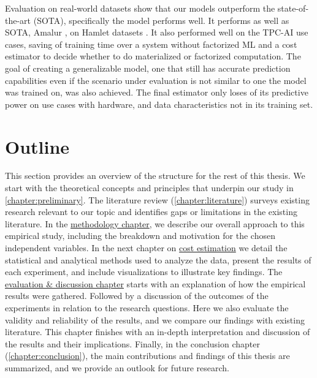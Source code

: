 Evaluation on real-world datasets show that our models outperform the state-of-the-art (SOTA), specifically the  model performs well. It performs  as well as SOTA, Amalur \cite{schijndel_cost_estimation}, on Hamlet datasets \cite{2016-hamlet-sigmod}. It also performed well on the TPC-AI use cases, saving  of training time over a system without factorized ML and a cost estimator to decide whether to do materialized or factorized computation. The goal of creating a generalizable model, one that still has accurate prediction capabilities even if the scenario under evaluation is not similar to one the model was trained on, was also achieved. The final estimator only loses  of its predictive power on use cases with hardware, and data characteristics not in its training set.


\section{Outline}
This section provides an overview of the structure for the rest of this thesis. We start with the theoretical concepts and principles that underpin our study in \autoref{chapter:preliminary}. The literature review (\autoref{chapter:literature}) surveys existing research relevant to our topic and identifies gaps or limitations in the existing literature. In the \hyperref[chapter:methodology]{methodology chapter}, we describe our overall approach to this empirical study, including the breakdown and motivation for the chosen independent variables.  In the next chapter on \hyperref[chapter:cost-estimation]{cost estimation} we detail the statistical and analytical methods used to analyze the data, present the results of each experiment, and include visualizations to illustrate key findings. The \hyperref[chapter:evaluation-discussion]{evaluation \& discussion chapter} starts with an explanation of how the empirical results were gathered. Followed by a discussion of the outcomes of the experiments in relation to the research questions. Here we also evaluate the validity and reliability of the results, and we compare our findings with existing literature. This chapter finishes with an in-depth interpretation and discussion of the results and their implications.  Finally, in the conclusion chapter (\autoref{chapter:conclusion}), the main contributions and findings of this thesis are summarized, and we provide an outlook for future research.

